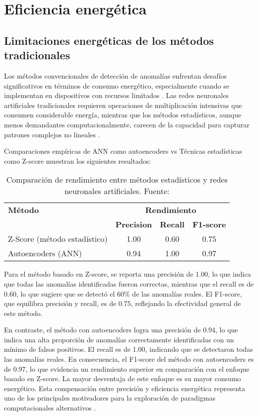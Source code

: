 \section{Eficiencia energética}
\subsection{Limitaciones energéticas de los métodos tradicionales}

Los métodos convencionales de detección de anomalías enfrentan desafíos significativos en términos de consumo energético, especialmente cuando se implementan en dispositivos con recursos limitados \cite{skatchkovsky_bayesian_2022}. Las redes neuronales artificiales tradicionales requieren operaciones de multiplicación intensivas que consumen considerable energía, mientras que los métodos estadísticos, aunque menos demandantes computacionalmente, carecen de la capacidad para capturar patrones complejos no lineales \cite{haddad_comparative_2024,mali_comparison_2024}.

Comparaciones empíricas de ANN como autoencoders vs Técnicas estadísticas como Z-score muestran los siguientes resultados:

\begin{table}[htbp]
\centering
\begin{tabular}{lccc}
\hline \hline
\textbf{Método} & \multicolumn{3}{c}{\textbf{Rendimiento}} \\
\cline{2-4} 
 & \textbf{Precision} & \textbf{Recall} & \textbf{F1-score} \\
\hline
Z-Score (método estadístico) & 1.00 & 0.60 & 0.75 \\
Autoencoders (ANN) & 0.94 & 1.00 & 0.97 \\
\hline \hline
\end{tabular}
\caption{Comparación de rendimiento entre métodos estadísticos y redes neuronales artificiales. Fuente: \cite{mali_comparison_2024}}
\label{tab:my_label}
\end{table}

Para el método basado en Z-score, se reporta una precisión de 1.00, lo que indica que todas las anomalías identificadas fueron correctas, mientras que el recall es de 0.60, lo que sugiere que se detectó el 60\% de las anomalías reales. El F1-score, que equilibra precisión y recall, es de 0.75, reflejando la efectividad general de este método.

En contraste, el método con autoencoders logra una precisión de 0.94, lo que indica una alta proporción de anomalías correctamente identificadas con un mínimo de falsos positivos. El recall es de 1.00, indicando que se detectaron todas las anomalías reales. En consecuencia, el F1-score del método con autoencoders es de 0.97, lo que evidencia un rendimiento superior en comparación con el enfoque basado en Z-score. La mayor desventaja de este enfoque es su mayor consumo energético. Esta compensación entre precisión y eficiencia energética representa uno de los principales motivadores para la exploración de paradigmas computacionales alternativos \cite{mali_comparison_2024}.


